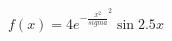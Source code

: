 \documentclass[preview]{standalone}
\begin{document}
\begin{align*}
f(x) = 4e^{-\frac{x^2}{sigma}^2} \sin{2.5x}
\end{align*}
\end{document}
